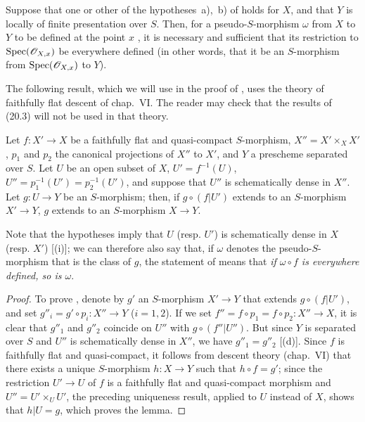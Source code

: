 \begin{corollary}[20.3.9]
\label{IV.20.3.9}
Suppose that one or other of the hypotheses~a),~b) of  holds for $X$, and that $Y$ is locally of finite presentation over $S$.
Then, for a pseudo-$S$-morphism $\omega$ from $X$ to $Y$ to be defined at the point $x$ , it is necessary and sufficient that its restriction to $\operatorname{Spec}(\mathscr{O}_{X,x})$ be everywhere defined (in other words, that it be an $S$-morphism from $\operatorname{Spec}(\mathscr{O}_{X,x})$ to $Y$).
\end{corollary}

The following result, which we will use in the proof of , uses the theory of faithfully flat descent of chap.~VI.
The reader may check that the results of (20.3) will not be used in that theory.

\begin{lemma}[20.3.10]
\label{IV.20.3.10}
Let $f:X'\to X$ be a faithfully flat and quasi-compact $S$-morphism, $X''=X'\times_X X'$, $p_1$ and $p_2$ the canonical projections of $X''$ to $X'$, and $Y$ a prescheme separated over $S$.
Let $U$ be an open subset of $X$, $U'=f^{-1}(U)$, $U''=p_1^{-1}(U')=p_2^{-1}(U')$, and suppose that $U''$ is schematically dense in $X''$.
Let $g:U\to Y$ be an $S$-morphism; then, if $g\circ(f|U')$ extends to an $S$-morphism $X'\to Y$, $g$ extends to an $S$-morphism $X\to Y$.
\end{lemma}

Note that the hypotheses imply that $U$ (resp. $U'$) is schematically dense in $X$ (resp. $X'$) [(i)]; we can therefore also say that, if $\omega$ denotes the pseudo-$S$-morphism that is the class of $g$, the statement of  means that \emph{if $\omega\circ f$ is everywhere defined, so is $\omega$}.

\begin{proof}
To prove , denote by $g'$ an $S$-morphism $X'\to Y$ that extends $g\circ(f|U')$, and set $g''_i=g'\circ p_i:X''\to Y$ ($i=1,2$).
If we set $f''=f\circ p_1=f\circ p_2:X''\to X$, it is clear that $g''_1$ and $g''_2$ coincide on $U''$ with $g\circ(f''|U'')$.
But since $Y$ is separated over $S$ and $U''$ is schematically dense in $X''$, we have $g''_1=g''_2$ [(d)].
Since $f$ is faithfully flat and quasi-compact, it follows from descent theory (chap.~VI) that there exists a unique $S$-morphism $h:X\to Y$ such that $h\circ f=g'$; since the restriction $U'\to U$ of $f$ is a faithfully flat and quasi-compact morphism and $U''=U'\times_U U'$, the preceding uniqueness result, applied to $U$ instead of $X$, shows that $h|U=g$, which proves the lemma.
\end{proof}

